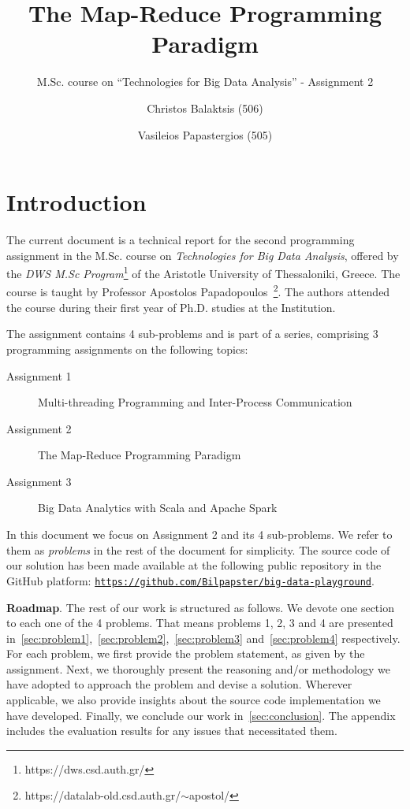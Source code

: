 \documentclass[acmlarge]{acmart}
\begin{document}
\title{The Map-Reduce Programming Paradigm}
\subtitle{M.Sc. course on ``Technologies for Big Data Analysis'' - Assignment 2}

\author{Christos Balaktsis (506)}
\author{Vasileios Papastergios (505)}

\renewcommand{\shortauthors}{C. Balaktsis and V. Papastergios}
\maketitle

\section{Introduction}

The current document is a technical report for the second programming assignment in the M.Sc. course on
\emph{Technologies for Big Data Analysis}, offered by the \emph{DWS M.Sc Program}\footnote{https://dws.csd.auth.gr/} of the Aristotle University of Thessaloniki, Greece. The course is taught by Professor Apostolos Papadopoulos~\footnote{https://datalab-old.csd.auth.gr/$\sim$apostol/}. The authors attended the course during their first year of Ph.D. studies at the Institution.

The assignment contains 4 sub-problems and is part of a series, comprising 3 programming assignments on the following topics:
\begin{description}
  \item[Assignment 1] Multi-threading Programming and Inter-Process Communication
  \item[Assignment 2] The Map-Reduce Programming Paradigm
  \item[Assignment 3] Big Data Analytics with Scala and Apache Spark
\end{description}
In this document we focus on Assignment 2 and its 4 sub-problems.
We refer to them as \emph{problems} in the rest of the document for simplicity.
The source code of our solution has been made available at the following public repository in the GitHub platform: \href{https://github.com/Bilpapster/big-data-playground}{\texttt{\small https://github.com/Bilpapster/big-data-playground}}.

\textbf{Roadmap}.
The rest of our work is structured as follows.
We devote one section to each one of the 4 problems.
That means problems 1, 2, 3 and 4 are presented in~\autoref{sec:problem1},~\autoref{sec:problem2},~\autoref{sec:problem3} and~\autoref{sec:problem4} respectively.
For each problem, we first provide the problem statement, as given by the assignment.
Next, we thoroughly present the reasoning and/or methodology we have adopted to approach the problem and devise a solution.
Wherever applicable, we also provide insights about the source code implementation we have developed.
Finally, we conclude our work in~\autoref{sec:conclusion}.
The appendix includes the evaluation results for any issues that necessitated them.
\end{document}
